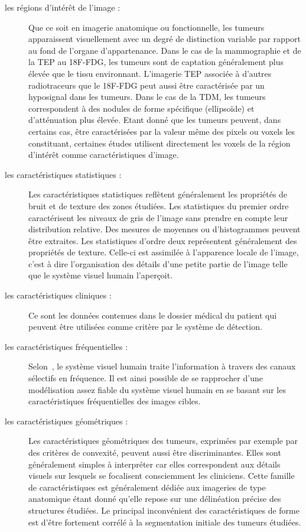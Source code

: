 \begin{description}
\item[les régions d’intérêt de l’image :] Que ce soit en imagerie anatomique ou fonctionnelle, les tumeurs apparaissent visuellement avec un degré de distinction variable par rapport au fond de l’organe d’appartenance. Dans le cas de la mammographie et de la TEP au 18F-FDG, les tumeurs sont de captation généralement plus élevée que le tissu environnant. L’imagerie TEP associée à d’autres radiotraceurs que le 18F-FDG peut aussi être caractérisée par un hyposignal dans les tumeurs. Dans le cas de la TDM, les tumeurs correspondent à des nodules de forme spécifique (ellipsoïde) et d’atténuation plus élevée. Etant donné que les tumeurs peuvent, dans certains cas, être caractérisées par la valeur même des pixels ou voxels les constituant, certaines études utilisent directement les voxels de la région d'intérêt comme caractéristiques d’image.
\item[les caractéristiques statistiques : ] Les caractéristiques statistiques reflètent généralement les propriétés de bruit et de texture des zones étudiées. Les statistiques du premier ordre caractérisent les niveaux de gris de l’image sans prendre en compte leur distribution relative. Des mesures de moyennes ou d’histogrammes peuvent être extraites. Les statistiques d’ordre deux représentent généralement des propriétés de texture. Celle-ci est assimilée à l’apparence locale de l’image, c’est à dire l’organisation des détails d’une petite partie de l’image telle que le système visuel humain l’aperçoit.
\item[les caractéristiques cliniques : ] Ce sont les données contenues dans le dossier médical du patient qui peuvent être utilisées comme critère par le système de détection.
\item[les caractéristiques fréquentielles :] Selon~\cite{sachs1971spatial}, le système visuel humain traite l’information à travers des canaux sélectifs en fréquence. Il est ainsi possible de se rapprocher d’une modélisation assez fiable du système visuel humain en se basant sur les caractéristiques fréquentielles des images cibles.
\item[les caractéristiques géométriques :] Les caractéristiques géométriques des tumeurs, exprimées par exemple par des critères de convexité, peuvent aussi être discriminantes. Elles sont généralement simples à interpréter car elles correspondent aux détails visuels sur lesquels se focalisent consciemment les cliniciens. Cette famille de caractéristiques est généralement dédiée aux imageries de type anatomique étant donné qu’elle repose sur une délinéation précise des structures étudiées. Le principal inconvénient des caractéristiques de forme est d’être fortement corrélé à la segmentation initiale des tumeurs étudiées.
\end{description}



